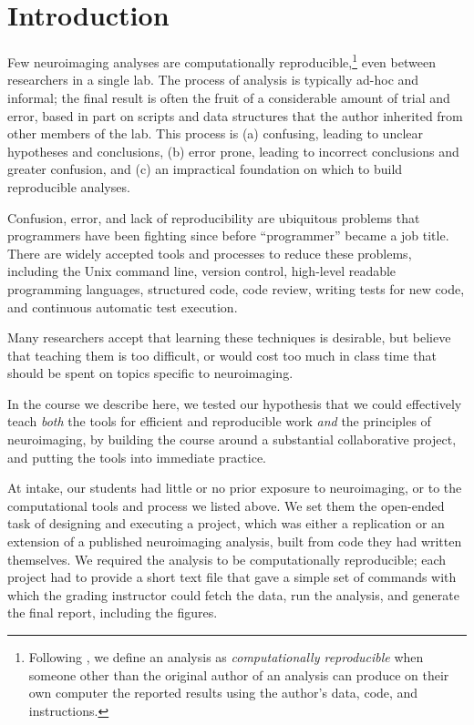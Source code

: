 \section{Introduction}

Few neuroimaging analyses are computationally reproducible,\footnote{Following
\citet{buckheit1995wavelab}, we define an analysis as \emph{computationally
reproducible} when someone other than the original author of an analysis can
produce on their own computer the reported results using the author's data,
code, and instructions.}
even between researchers in a single lab.
The process of analysis is typically ad-hoc and informal; the final result
is often the fruit of a considerable amount of trial and error, based in part
on scripts and data structures that the author inherited from other members of
the lab.
This process is
(a) confusing, leading to unclear hypotheses and conclusions,
(b) error prone, leading to incorrect conclusions and greater confusion,
and (c) an impractical foundation on which to build reproducible analyses.

Confusion, error, and lack of reproducibility are ubiquitous problems that
programmers have been fighting since before ``programmer'' became a job title.
There are widely accepted tools and processes to reduce these problems,
including the Unix command line, version control, high-level readable
programming languages, structured code, code review, writing tests for new
code, and continuous automatic test execution.

Many researchers accept that learning these techniques is desirable, but
believe that teaching them is too difficult, or would cost too much in class
time that should be spent on topics specific to neuroimaging.

In the course we describe here, we tested our hypothesis that we could
effectively teach \emph{both} the tools for efficient and reproducible work
\emph{and} the principles of neuroimaging, by building the course around a
substantial collaborative project, and putting the tools into immediate
practice.

At intake, our students had little or no prior exposure to neuroimaging,
or to the computational tools and process we listed above.  We set them the
open-ended task of designing and executing a project, which was either a
replication or an extension of a published neuroimaging analysis, built from
code they had written themselves.  We required the analysis to be computationally
reproducible; each project had to provide a short text file that gave a
simple set of commands with which the grading instructor could fetch the data,
run the analysis, and generate the final report, including the figures.

